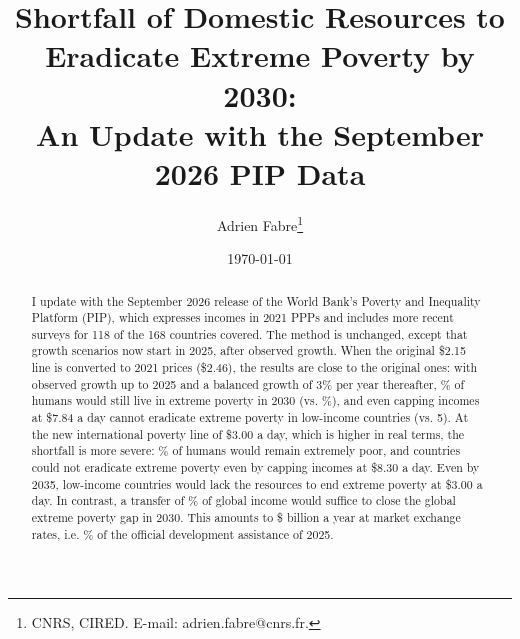 \documentclass[12pt,english]{article}
\title{Shortfall of Domestic Resources to Eradicate Extreme Poverty by 2030:\\ An Update with the September 2026 PIP Data}
\author{Adrien Fabre\thanks{CNRS, CIRED. E-mail: adrien.fabre@cnrs.fr.}}
\date{\today}
\begin{document}
\maketitle

\begin{abstract}
I update \cite{fabre_shortfall_2025} with the September 2026 release of the World Bank's Poverty and Inequality Platform (PIP), which expresses incomes in 2021 PPPs and includes more recent surveys for 118 of the 168 countries covered. The method is unchanged, except that growth scenarios now start in 2025, after observed growth. When the original \$2.15 line is converted to 2021 prices (\$2.46), the results are close to the original ones: with observed growth up to 2025 and a balanced growth of 3\% per year thereafter, \upRatePovThreeEq\% of humans would still live in extreme poverty in 2030 (vs. \PaperRatePovThree\%), and even capping incomes at \$7.84 a day cannot eradicate extreme poverty in \upNbCapEq{} low-income countries (vs. 5). At the new international poverty line of \$3.00 a day, which is higher in real terms, the shortfall is more severe: \upRatePovThree\% of humans would remain extremely poor, and \upNbCapEight{} countries could not eradicate extreme poverty even by capping incomes at \$8.30 a day. Even by 2035, \upNbCapTF{} low-income countries would lack the resources to end extreme poverty at \$3.00 a day. In contrast, a transfer of \upGapThree\% of global income would suffice to close the global extreme poverty gap in 2030. This amounts to \$\upGapBnUSD{} billion a year at market exchange rates, i.e. \upGapShareODA\% of the official development assistance of 2025.
\end{abstract}





\end{document}
